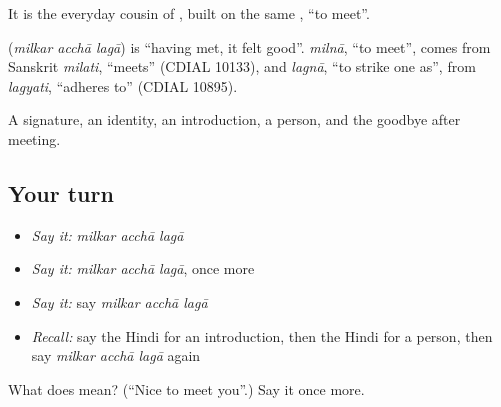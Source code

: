 It is the everyday cousin of \textbf{   }, built on the same \textbf{}, \textquotedblleft{}to meet\textquotedblright{}.

\begin{cousinweb}
\textbf{  } (\emph{milkar acchā lagā}) is \textquotedblleft{}having met, it felt good\textquotedblright{}. \emph{milnā}, \textquotedblleft{}to meet\textquotedblright{}, comes from Sanskrit \emph{milati}, \textquotedblleft{}meets\textquotedblright{} (CDIAL 10133), and \emph{lagnā}, \textquotedblleft{}to strike one as\textquotedblright{}, from \emph{lagyati}, \textquotedblleft{}adheres to\textquotedblright{} (CDIAL 10895).
\end{cousinweb}

\begin{grammarlens}[title={What you've built}]
A signature, an identity, an introduction, a person, and the goodbye after meeting.
\end{grammarlens}

\subsection*{Your turn}
\begin{itemize}
\raggedright
  \item \emph{Say it:} \emph{milkar acchā lagā}
  \item \emph{Say it:} \emph{milkar acchā lagā}, once more
  \item \emph{Say it:} say \emph{milkar acchā lagā}
  \item \emph{Recall:} say the Hindi for an introduction, then the Hindi for a person, then say \emph{milkar acchā lagā} again
\end{itemize}

\begin{tcolorbox}[breakable,colback=teal!4,colframe=teal!35!black,title={Before you move on}]
What does    mean? (\textquotedblleft{}Nice to meet you\textquotedblright{}.) Say it once more.
\end{tcolorbox}
